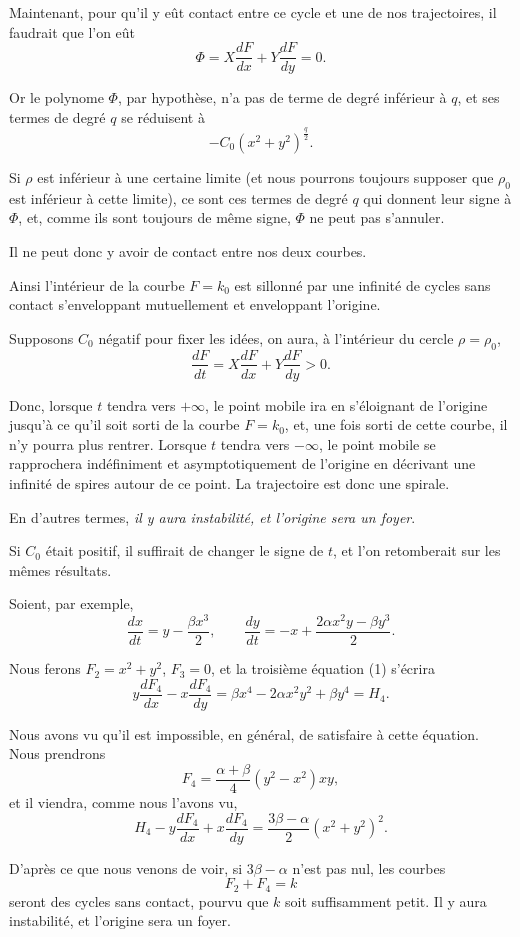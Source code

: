 \documentclass[11pt]{article}
\begin{document}
Maintenant, pour qu’il y eût contact entre ce cycle et une de nos trajectoires, il faudrait que l’on eût
\[
\Phi=X\frac{dF}{dx}+Y\frac{dF}{dy}=0.
\]

Or le polynome $\Phi$, par hypothèse, n’a pas de terme de degré inférieur à $q$, et ses termes de degré $q$ se réduisent à
\[
-C_0(x^2+y^2)^{\frac q2}.
\]

Si $\rho$ est inférieur à une certaine limite (et nous pourrons toujours supposer que $\rho_0$ est inférieur à cette limite), ce sont ces termes de degré $q$ qui donnent leur signe à $\Phi$, et, comme ils sont toujours de même signe, $\Phi$ ne peut pas s’annuler.

Il ne peut donc y avoir de contact entre nos deux courbes.

Ainsi l’intérieur de la courbe $F=k_0$ est sillonné par une infinité de cycles sans contact s’enveloppant mutuellement et enveloppant l’origine.

Supposons $C_0$ négatif pour fixer les idées, on aura, à l’intérieur du cercle $\rho=\rho_0$,
\[
\frac{dF}{dt}=X\frac{dF}{dx}+Y\frac{dF}{dy}>0.
\]

Donc, lorsque $t$ tendra vers $+\infty$, le point mobile ira en s’éloignant de l’origine jusqu’à ce qu’il soit sorti de la courbe $F=k_0$, et, une fois sorti de cette courbe, il n’y pourra plus rentrer. Lorsque $t$ tendra vers $-\infty$, le point mobile se rapprochera indéfiniment et asymptotiquement de l’origine en décrivant une infinité de spires autour de ce point. La trajectoire est donc une spirale.

En d’autres termes, \emph{il y aura instabilité, et l’origine sera un foyer}.

Si $C_0$ était positif, il suffirait de changer le signe de $t$, et l’on retomberait sur les mêmes résultats.

Soient, par exemple,
\[
\frac{dx}{dt}=y-\frac{\beta x^3}{2},
\qquad
\frac{dy}{dt}=-x+\frac{2\alpha x^2y-\beta y^3}{2}.
\]

Nous ferons $F_2=x^2+y^2$, $F_3=0$, et la troisième équation (1) s’écrira
\[
y\frac{dF_4}{dx}-x\frac{dF_4}{dy}=\beta x^4-2\alpha x^2y^2+\beta y^4=H_4.
\]

Nous avons vu qu’il est impossible, en général, de satisfaire à cette équation. Nous prendrons
\[
F_4=\frac{\alpha+\beta}{4}(y^2-x^2)xy,
\]
et il viendra, comme nous l’avons vu,
\[
H_4-y\frac{dF_4}{dx}+x\frac{dF_4}{dy}=\frac{3\beta-\alpha}{2}(x^2+y^2)^2.
\]

D’après ce que nous venons de voir, si $3\beta-\alpha$ n’est pas nul, les courbes
\[
F_2+F_4=k
\]
seront des cycles sans contact, pourvu que $k$ soit suffisamment petit. Il y aura instabilité, et l’origine sera un foyer.
\end{document}
